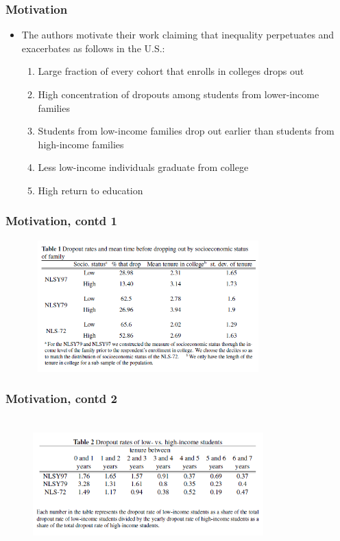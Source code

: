 \begin{frame}
	\frametitle{Motivation}
		\begin{itemize}
			\item The authors motivate their work claiming that inequality perpetuates and exacerbates as follows in the U.S.:
				\begin{enumerate}
			\item Large fraction of every cohort that enrolls in colleges drops out
			\item High concentration of dropouts among students from lower-income families
			\item Students from low-income families drop out earlier than students from high-income families
			\item Less low-income individuals graduate from college
			\item High return to education
				\end{enumerate}
		\end{itemize}
\end{frame}

\begin{frame}
	\frametitle{Motivation, contd 1}
		\begin{figure}[H] 
		\caption*{}
		\centering
		\includegraphics[width=3.5in, height=2in]{Figures/OT/table1.png}
		\end{figure}
\end{frame}

\begin{frame}
	\frametitle{Motivation, contd 2}
		\begin{figure}[H] 
		\caption*{}
		\centering
		\includegraphics[width=3.5in, height=2in]{Figures/OT/table2.png}
		\end{figure}
\end{frame}

